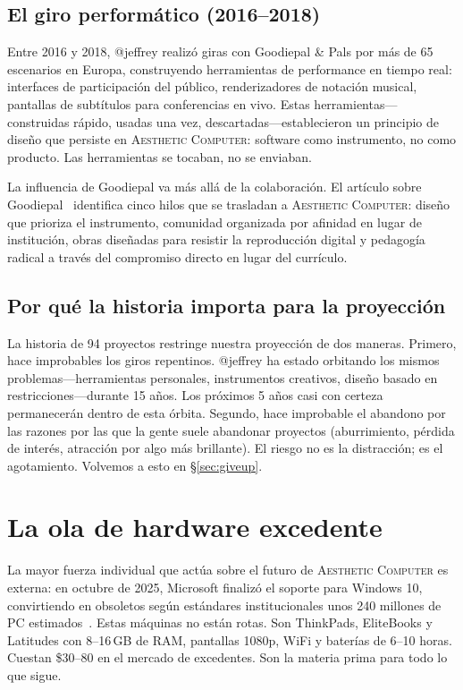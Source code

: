 \documentclass[10pt,letterpaper,twocolumn]{article}
\newcommand{\ac}{\textsc{Aesthetic Computer}}
\begin{document}
\subsection{El giro performático (2016--2018)}

Entre 2016 y 2018, @jeffrey realizó giras con Goodiepal \& Pals por más de 65 escenarios en Europa, construyendo herramientas de performance en tiempo real: interfaces de participación del público, renderizadores de notación musical, pantallas de subtítulos para conferencias en vivo. Estas herramientas---construidas rápido, usadas una vez, descartadas---establecieron un principio de diseño que persiste en \ac{}: software como instrumento, no como producto. Las herramientas se tocaban, no se enviaban.

La influencia de Goodiepal va más allá de la colaboración. El artículo sobre Goodiepal~\citep{scudder2026goodiepal} identifica cinco hilos que se trasladan a \ac{}: diseño que prioriza el instrumento, comunidad organizada por afinidad en lugar de institución, obras diseñadas para resistir la reproducción digital y pedagogía radical a través del compromiso directo en lugar del currículo.

\subsection{Por qué la historia importa para la proyección}

La historia de 94 proyectos restringe nuestra proyección de dos maneras. Primero, hace improbables los giros repentinos. @jeffrey ha estado orbitando los mismos problemas---herramientas personales, instrumentos creativos, diseño basado en restricciones---durante 15 años. Los próximos 5 años casi con certeza permanecerán dentro de esta órbita. Segundo, hace improbable el abandono por las razones por las que la gente suele abandonar proyectos (aburrimiento, pérdida de interés, atracción por algo más brillante). El riesgo no es la distracción; es el agotamiento. Volvemos a esto en \S\ref{sec:giveup}.


\section{La ola de hardware excedente}
\label{sec:surplus}

La mayor fuerza individual que actúa sobre el futuro de \ac{} es externa: en octubre de 2025, Microsoft finalizó el soporte para Windows 10, convirtiendo en obsoletos según estándares institucionales unos 240 millones de PC estimados~\citep{ewaste2024monitor}. Estas máquinas no están rotas. Son ThinkPads, EliteBooks y Latitudes con 8--16\,GB de RAM, pantallas 1080p, WiFi y baterías de 6--10 horas. Cuestan \$30--80 en el mercado de excedentes. Son la materia prima para todo lo que sigue.
\end{document}
